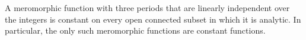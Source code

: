 A meromorphic function with three periods that are linearly independent over the integers is constant on every open connected subset in which it is analytic. In particular, the only such meromorphic functions are constant functions.
